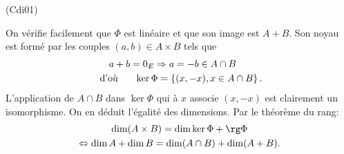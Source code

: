 \begin{tiny}(Cdi01)\end{tiny} 
On vérifie facilement que $\Phi$ est linéaire et que son image est $A+B$. Son noyau est formé par les couples $(a,b)\in A\times B$ tels que 
\begin{multline*}
  a+b = 0_E \Rightarrow a = -b \in A\cap B\hspace{0.5cm} \\ \text{ d'où }\hspace{0.5cm} \ker \Phi = \left\lbrace (x,-x), x\in A\cap B \right\rbrace .
\end{multline*}
L'application de $A\cap B$ dans $\ker \Phi$ qui à $x$ associe $(x,-x)$ est clairement un isomorphisme. On en déduit l'égalité des dimensions. Par le théorème du rang:
\begin{multline*}
\dim(A\times B) = \dim \ker \Phi + \rg \Phi \\ 
\Leftrightarrow \dim A + \dim B = \dim(A\cap B) + \dim(A+B).
\end{multline*}

